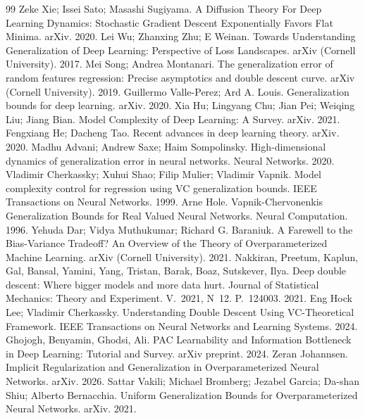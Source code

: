 \begin{thebibliography}{99}
 Zeke Xie; Issei Sato; Masashi Sugiyama. A Diffusion Theory For Deep Learning Dynamics: Stochastic Gradient Descent Exponentially Favors Flat Minima. arXiv. 2020.
 Lei Wu; Zhanxing Zhu; E Weinan. Towards Understanding Generalization of Deep Learning: Perspective of Loss Landscapes. arXiv (Cornell University). 2017.
 Mei Song; Andrea Montanari. The generalization error of random features regression: Precise asymptotics and double descent curve. arXiv (Cornell University). 2019.
 Guillermo Valle-Perez; Ard A. Louis. Generalization bounds for deep learning. arXiv. 2020.
 Xia Hu; Lingyang Chu; Jian Pei; Weiqing Liu; Jiang Bian. Model Complexity of Deep Learning: A Survey. arXiv. 2021.
 Fengxiang He; Dacheng Tao. Recent advances in deep learning theory. arXiv. 2020.
 Madhu Advani; Andrew Saxe; Haim Sompolinsky. High-dimensional dynamics of generalization error in neural networks. Neural Networks. 2020.
 Vladimir Cherkassky; Xuhui Shao; Filip Mulier; Vladimir Vapnik. Model complexity control for regression using VC generalization bounds. IEEE Transactions on Neural Networks. 1999.
 Arne Hole. Vapnik-Chervonenkis Generalization Bounds for Real Valued Neural Networks. Neural Computation. 1996.
 Yehuda Dar; Vidya Muthukumar; Richard G. Baraniuk. A Farewell to the Bias-Variance Tradeoff? An Overview of the Theory of Overparameterized Machine Learning. arXiv (Cornell University). 2021.
 Nakkiran, Preetum, Kaplun, Gal, Bansal, Yamini, Yang, Tristan, Barak, Boaz, Sutskever, Ilya. Deep double descent: Where bigger models and more data hurt. Journal of Statistical Mechanics: Theory and Experiment. V.~2021, N~12. P.~124003. 2021.
 Eng Hock Lee; Vladimir Cherkassky. Understanding Double Descent Using VC-Theoretical Framework. IEEE Transactions on Neural Networks and Learning Systems. 2024.
 Ghojogh, Benyamin, Ghodsi, Ali. PAC Learnability and Information Bottleneck in Deep Learning: Tutorial and Survey. arXiv preprint. 2024.
 Zeran Johannsen. Implicit Regularization and Generalization in Overparameterized Neural Networks. arXiv. 2026.
 Sattar Vakili; Michael Bromberg; Jezabel Garcia; Da-shan Shiu; Alberto Bernacchia. Uniform Generalization Bounds for Overparameterized Neural Networks. arXiv. 2021.

\end{thebibliography}
